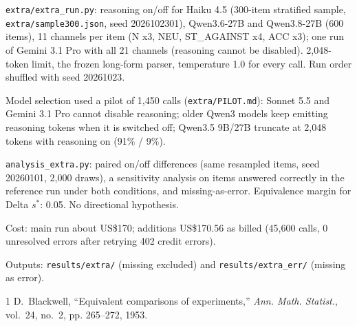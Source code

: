 \documentclass[10pt,a4paper]{article}
\begin{document}
\noindent \texttt{extra/\allowbreak{}extra\_\allowbreak{}run.py}: reasoning on/off for Haiku 4.5 (300-item stratified sample, \texttt{extra/\allowbreak{}sample300.json}, seed 2026102301), Qwen3.6-27B and Qwen3.8-27B (600 items), 11 channels per item (N x3, NEU, ST\_AGAINST x4, ACC x3); one run of Gemini 3.1 Pro with all 21 channels (reasoning cannot be disabled). 2,048-token limit, the frozen long-form parser, temperature 1.0 for every call. Run order shuffled with seed 20261023.

\noindent Model selection used a pilot of 1,450 calls (\texttt{extra/\allowbreak{}PILOT.md}): Sonnet 5.5 and Gemini 3.1 Pro cannot disable reasoning; older Qwen3 models keep emitting reasoning tokens when it is switched off; Qwen3.5 9B/27B truncate at 2,048 tokens with reasoning on (91\% / 9\%).

\noindent \texttt{analysis\_\allowbreak{}extra.py}: paired on/off differences (same resampled items, seed 20260101, 2,000 draws), a sensitivity analysis on items answered correctly in the reference run under both conditions, and missing-as-error. Equivalence margin for Delta $s^{*}$: 0.05. No directional hypothesis.

\noindent Cost: main run about US\$170; additions US\$170.56 as billed (45,600 calls, 0 unresolved errors after retrying 402 credit errors).

\noindent Outputs: \texttt{results/\allowbreak{}extra/\allowbreak{}} (missing excluded) and \texttt{results/\allowbreak{}extra\_\allowbreak{}err/\allowbreak{}} (missing as error).

\begin{thebibliography}{1}
D.~Blackwell, ``Equivalent comparisons of experiments,'' \emph{Ann. Math. Statist.}, vol.~24, no.~2, pp. 265--272, 1953.
\end{thebibliography}
\end{document}
